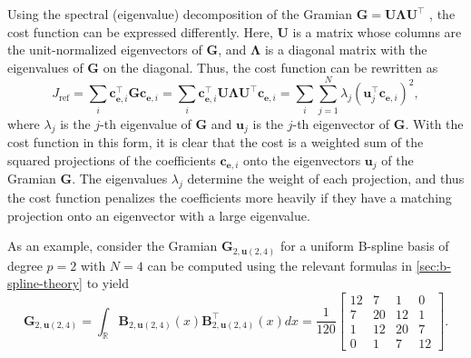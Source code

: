 Using the spectral (eigenvalue) decomposition of the Gramian $\mathbf G = \mathbf U \mathbf \Lambda \mathbf U^\top$ \citep{horn2013positive}, the cost function can be expressed differently. Here, $\mathbf U$ is a matrix whose columns are the unit-normalized eigenvectors of $\mathbf G$, and $\mathbf \Lambda$ is a diagonal matrix with the eigenvalues of $\mathbf G$ on the diagonal. Thus, the cost function can be rewritten as
\begin{equation}\label{eq:cost-function-spectral-decomposition}
    J_\text{ref} = \sum_i \mathbf c_{\mathbf e,i}^\top \mathbf G \mathbf c_{\mathbf e,i} = \sum_i \mathbf c_{\mathbf e,i}^\top \mathbf U \mathbf \Lambda \mathbf U^\top \mathbf c_{\mathbf e,i} = \sum_i \sum_{j=1}^{N} \lambda_j (\mathbf u_j^\top \mathbf c_{\mathbf e,i})^2,
\end{equation}
where $\lambda_j$ is the $j$-th eigenvalue of $\mathbf G$ and $\mathbf u_j$ is the $j$-th eigenvector of $\mathbf G$. With the cost function in this form, it is clear that the cost is a weighted sum of the squared projections of the coefficients $\mathbf c_{\mathbf e,i}$ onto the eigenvectors $\mathbf u_j$ of the Gramian $\mathbf G$. The eigenvalues $\lambda_j$ determine the weight of each projection, and thus the cost function penalizes the coefficients more heavily if they have a matching projection onto an eigenvector with a large eigenvalue.

As an example, consider the Gramian $\mathbf G_{2,\mathbf u(2,4)}$ for a uniform B-spline basis of degree $p=2$ with $N=4$ can be computed using the relevant formulas in \cref{sec:b-spline-theory} to yield
\begin{equation}
    \mathbf G_{2,\mathbf u(2,4)} = \int_\mathbb R \mathbf B_{2,\mathbf u(2,4)}(x) \mathbf B_{2,\mathbf u(2,4)}^\top(x) dx = 
    \frac{1}{120}\begin{bmatrix}
        12 & 7 & 1 & 0 \\
        7 & 20 & 12 & 1 \\
        1 & 12 & 20 & 7 \\
        0 & 1 & 7 & 12
    \end{bmatrix}.
\end{equation}

